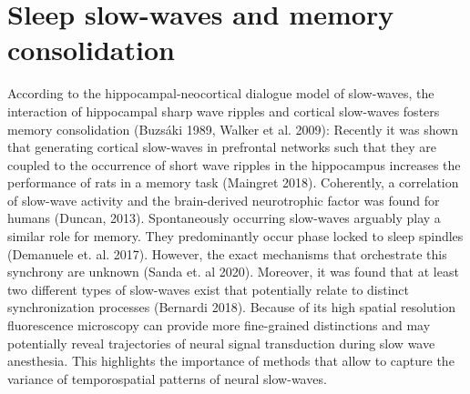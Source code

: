 \section{Sleep slow-waves and memory consolidation}
According to the hippocampal-neocortical dialogue model of slow-waves, the interaction of hippocampal sharp wave ripples and cortical slow-waves fosters memory consolidation (Buzsáki 1989, Walker et al. 2009): Recently it was shown that generating cortical slow-waves in prefrontal networks such that they are coupled to the occurrence of short wave ripples in the hippocampus increases the performance of rats in a memory task (Maingret 2018). Coherently, a correlation of slow-wave activity and the brain-derived neurotrophic factor was found for humans (Duncan, 2013). Spontaneously occurring slow-waves arguably play a similar role for memory. They predominantly occur phase locked to sleep spindles (Demanuele et. al. 2017). However, the exact mechanisms that orchestrate this synchrony are unknown (Sanda et. al 2020). Moreover, it was found that at least two different types of slow-waves exist that potentially relate to distinct synchronization processes (Bernardi 2018). Because of its high spatial resolution fluorescence microscopy can provide more fine-grained distinctions and may potentially reveal trajectories of neural signal transduction during slow wave anesthesia. This highlights the importance of methods that allow to capture the variance of temporospatial patterns of neural slow-waves.


